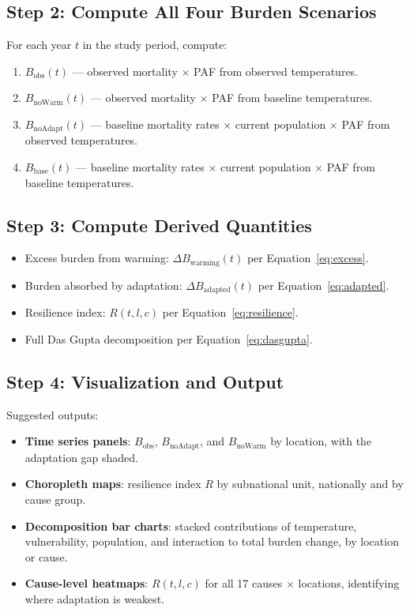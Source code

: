 \documentclass[11pt,a4paper]{article}
\begin{document}
\subsection{Step 2: Compute All Four Burden Scenarios}

For each year $t$ in the study period, compute:
\begin{enumerate}[nosep]
  \item $B_{\text{obs}}(t)$ --- observed mortality $\times$ PAF from observed temperatures.
  \item $B_{\text{noWarm}}(t)$ --- observed mortality $\times$ PAF from baseline temperatures.
  \item $B_{\text{noAdapt}}(t)$ --- baseline mortality rates $\times$ current population $\times$ PAF from observed temperatures.
  \item $B_{\text{base}}(t)$ --- baseline mortality rates $\times$ current population $\times$ PAF from baseline temperatures.
\end{enumerate}

\subsection{Step 3: Compute Derived Quantities}

\begin{itemize}[nosep]
  \item Excess burden from warming: $\Delta B_{\text{warming}}(t)$ per Equation~\eqref{eq:excess}.
  \item Burden absorbed by adaptation: $\Delta B_{\text{adapted}}(t)$ per Equation~\eqref{eq:adapted}.
  \item Resilience index: $R(t,l,c)$ per Equation~\eqref{eq:resilience}.
  \item Full Das Gupta decomposition per Equation~\eqref{eq:dasgupta}.
\end{itemize}

\subsection{Step 4: Visualization and Output}

Suggested outputs:
\begin{itemize}[nosep]
  \item \textbf{Time series panels}: $B_{\text{obs}}$, $B_{\text{noAdapt}}$, and $B_{\text{noWarm}}$ by location, with the adaptation gap shaded.
  \item \textbf{Choropleth maps}: resilience index $R$ by subnational unit, nationally and by cause group.
  \item \textbf{Decomposition bar charts}: stacked contributions of temperature, vulnerability, population, and interaction to total burden change, by location or cause.
  \item \textbf{Cause-level heatmaps}: $R(t,l,c)$ for all 17 causes $\times$ locations, identifying where adaptation is weakest.
\end{itemize}
\end{document}
